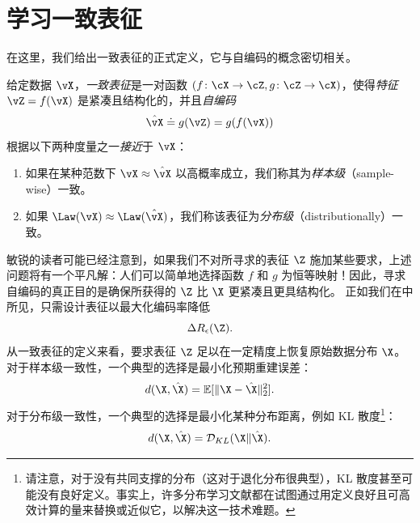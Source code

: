 \documentclass[../../book-main_zh.tex]{subfiles}
\begin{document}
\section{学习一致表征}\label{sec:consistent-representation}

在这里，我们给出一致表征的正式定义，它与自编码的概念密切相关。 %
\begin{definition}[一致表征]\label{def:bidirectional_rep}
    给定数据 \(\vX\)，\textit{一致表征}是一对函数 \((f \colon \cX \to \cZ, g \colon \cZ \to \cX)\)，使得\textit{特征} \(\vZ = f(\vX)\) 是紧凑且结构化的，并且\textit{自编码}
    \begin{equation}
        \hat{\vX} \doteq g(\vZ) = g(f(\vX))
    \end{equation}
    根据以下两种度量之一\textit{接近}于 \(\vX\)：
    \begin{enumerate}
        \item 如果在某种范数下 \(\vX \approx \hat{\vX}\) 以高概率成立，我们称其为\textit{样本级}（sample-wise）一致。
        \item 如果 \(\Law(\vX) \approx \Law(\hat{\vX})\)，我们称该表征为\textit{分布级}（distributionally）一致。
    \end{enumerate}
\end{definition}

敏锐的读者可能已经注意到，如果我们不对所寻求的表征 $\Z$ 施加某些要求，上述问题将有一个平凡解：人们可以简单地选择函数 $f$ 和 $g$ 为恒等映射！因此，寻求自编码的真正目的是确保所获得的 $\Z$ 比 $\X$ 更紧凑且更具结构化。
正如我们在中所见，只需设计表征以最大化编码率降低
\begin{equation}
    \Delta R_{\epsilon}(\Z).
\end{equation}%
从一致表征的定义来看，要求表征 $\Z$ 足以在一定精度上恢复原始数据分布 $\X$。对于样本级一致性，一个典型的选择是最小化预期重建误差：
\begin{equation}
    d(\X, \hat \X) = \mathbb{E}[\|\X - \hat\X\|_2^2].
\end{equation}
对于分布级一致性，一个典型的选择是最小化某种分布距离，例如 KL 散度\footnote{请注意，对于没有共同支撑的分布（这对于退化分布很典型），KL 散度甚至可能没有良好定义。事实上，许多分布学习文献都在试图通过用定义良好且可高效计算的量来替换或近似它，以解决这一技术难题。}：
\begin{equation}
    d(\X, \hat \X) = \mathcal{D}_{KL}(\X\|\hat\X).
\end{equation}
\end{document}
